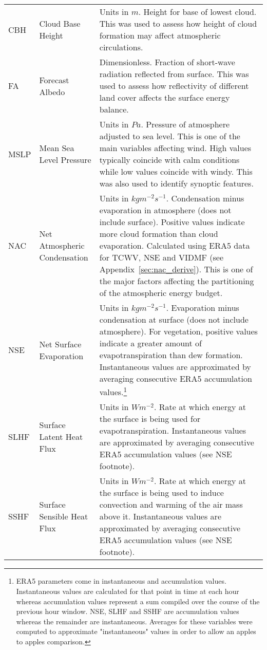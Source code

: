\begin{landscape}
\begin{longtable}{P{2cm}P{3cm}P{13cm}}
		\acs{CBH} & Cloud Base Height & Units in $m$. Height for base of lowest cloud. This was used to assess how height of cloud formation may affect atmospheric circulations. \\
		FA & Forecast Albedo & Dimensionless. Fraction of short-wave radiation reflected from surface. This was used to assess how reflectivity of different land cover affects the surface energy balance. \\
		\acs{MSLP} & Mean Sea Level Pressure & Units in $Pa$. Pressure of atmosphere adjusted to sea level. This is one of the main variables affecting wind. High values typically coincide with calm conditions while low values coincide with windy. This was also used to identify synoptic features. \\
		\acs{NAC} & Net Atmospheric Condensation & Units in $kg m^{-2} s^{-1}$. Condensation minus evaporation in atmosphere (does not include surface). Positive values indicate more cloud formation than cloud evaporation. Calculated using \ac{ERA5} data for \ac{TCWV}, \ac{NSE} and \ac{VIDMF} (see Appendix~\ref{sec:nac_derive}). This is one of the major factors affecting the partitioning of the atmospheric energy budget. \\
		\acs{NSE} & Net Surface Evaporation & Units in $kg m^{-2} s^{-1}$. Evaporation minus condensation at surface (does not include atmosphere). For vegetation, positive values indicate a greater amount of evapotranspiration than dew formation. Instantaneous values are approximated by averaging consecutive \ac{ERA5} accumulation values.\footnote{\ac{ERA5} parameters come in instantaneous and accumulation values. Instantaneous values are calculated for that point in time at each hour whereas accumulation values represent a sum compiled over the course of the previous hour window. \ac{NSE}, \ac{SLHF} and \ac{SSHF} are accumulation values whereas the remainder are instantaneous. Averages for these variables were computed to approximate "instantaneous" values in order to allow an apples to apples comparison.} \\
		\acs{SLHF} & Surface Latent Heat Flux & Units in $W m^{-2}$. Rate at which energy at the surface is being used for evapotranspiration. Instantaneous values are approximated by averaging consecutive \ac{ERA5} accumulation values (see \ac{NSE} footnote). \\
		\acs{SSHF} & Surface Sensible Heat Flux & Units in $W m^{-2}$. Rate at which energy at the surface is being used to induce convection and warming of the air mass above it. Instantaneous values are approximated by averaging consecutive \ac{ERA5} accumulation values (see \ac{NSE} footnote). \\

\end{longtable}
\end{landscape}
